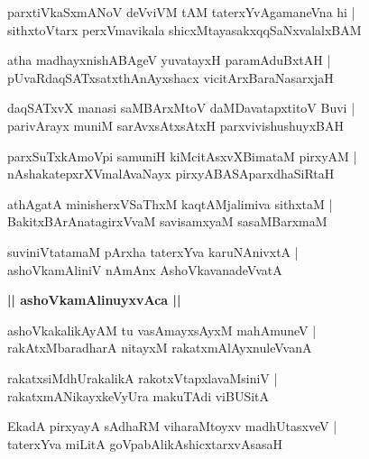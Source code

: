 \documentclass[twoside,12pt,openright]{book}
\newcounter{shloka}[chapter]
\def\uvaca#1{\centerline{{\large\textbf{#1}}}}
\begin{document}
\begin{shloka}%
parxtiVkaSxmANoV deVviVM tAM taterxYvAgamaneVna hi |\\
sithxtoVtarx perxVmavikala shicxMtayasakxqqSaNxvalalxBAM 
\end{shloka}

\begin{shloka}%
atha madhayxnishABAgeV yuvatayxH paramAduBxtAH |\\
pUvaRdaqSATxsatxthAnAyxshacx vicitArxBaraNasarxjaH 
\end{shloka}

\begin{shloka}%
daqSATxvX manasi saMBArxMtoV daMDavatapxtitoV Buvi |\\
parivArayx muniM sarAvxsAtxsAtxH parxvivishushuyxBAH 
\end{shloka}

\begin{shloka}%
parxSuTxkAmoVpi samuniH kiMcitAsxvXBimataM pirxyAM |\\
nAshakatepxrXVmalAvaNayx pirxyABASAparxdhaSiRtaH 
\end{shloka}

\begin{shloka}%
athAgatA minisherxVSaThxM  kaqtAMjalimiva sithxtaM |\\
BakitxBArAnatagirxVvaM savisamxyaM sasaMBarxmaM 
\end{shloka}

\begin{shloka}%
suviniVtatamaM pArxha taterxYva karuNAnivxtA |\\
ashoVkamAliniV nAmAnx AshoVkavanadeVvatA 
\end{shloka}

\uvaca{|| ashoVkamAlinuyxvAca ||}

\begin{shloka}%
ashoVkakalikAyAM tu vasAmayxsAyxM mahAmuneV |\\
rakAtxMbaradharA nitayxM rakatxmAlAyxnuleVvanA 
\end{shloka}

\begin{shloka}%
rakatxsiMdhUrakalikA rakotxVtapxlavaMsiniV |\\
rakatxmANikayxkeVyUra makuTAdi viBUSitA
\end{shloka}

\begin{shloka}%
EkadA pirxyayA sAdhaRM viharaMtoyxv madhUtasxveV |\\
taterxYva miLitA goVpabAlikAshicxtarxvAsasaH 
\end{shloka}
\end{document}
